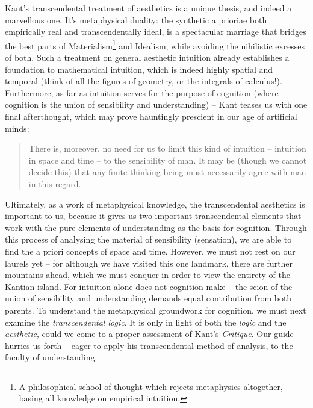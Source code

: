 Kant's transcendental treatment of aesthetics is a unique thesis, and indeed a marvellous one. It's metaphysical duality: the synthetic a prioriae both empirically real and transcendentally ideal, is a spectacular marriage that bridges the best parts of Materialism\footnote{A philosophical school of thought which rejects metaphysics altogether, basing all knowledge on empirical intuition.} and Idealism, while avoiding the nihilistic excesses of both. Such a treatment on general aesthetic intuition already establishes a foundation to mathematical intuition, which is indeed highly spatial and temporal (think of all the figures of geometry, or the integrals of calculus!). Furthermore, as far as intuition serves for the purpose of cognition (where cognition is the union of sensibility and understanding) -- Kant teases us with one final afterthought, which may prove hauntingly prescient in our age of artificial minds:

\clearpage

\begin{quote}
  There is, moreover, no need for us to limit this kind of intuition -- intuition in space and time -- to the sensibility of man. It may be (though we cannot decide this) that any finite thinking being must necessarily agree with man in this regard.

  \autocite[B72]{hackett}
\end{quote}

\noindent
Ultimately, as a work of metaphysical knowledge, the transcendental aesthetics is important to us, because it gives us two important transcendental elements that work with the pure elements of understanding as the basis for cognition. Through this process of analysing the material of sensibility (sensation), we are able to find the a priori concepts of space and time. However, we must not rest on our laurels yet -- for although we have visited this one landmark, there are further mountains ahead, which we must conquer in order to view the entirety of the Kantian island. For intuition alone does not cognition make -- the scion of the union of sensibility and understanding demands equal contribution from both parents. To understand the metaphysical groundwork for cognition, we must next examine the \emph{transcendental logic}. It is only in light of both the \emph{logic} and the \emph{aesthetic}, could we come to a proper assessment of Kant's \emph{Critique}. Our guide hurries us forth -- eager to apply his transcendental method of analysis, to the faculty of understanding.

